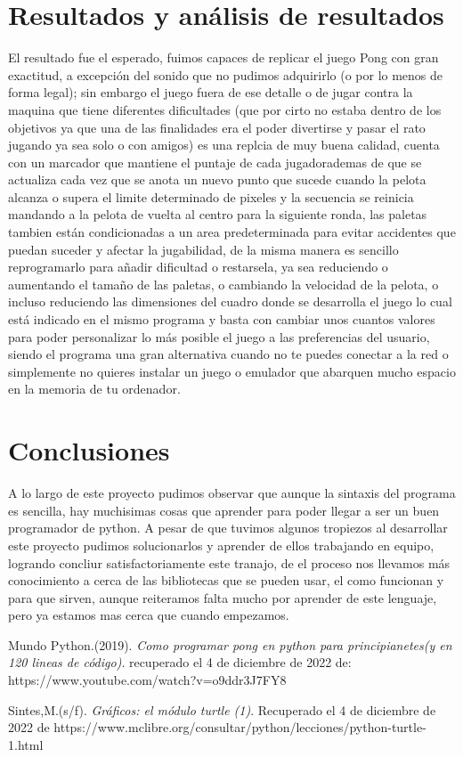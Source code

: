 \documentclass[journal]{IEEEtran}
\begin{document}
\section{Resultados y análisis de resultados}
El resultado fue el esperado, fuimos capaces de replicar el juego Pong con gran exactitud, a excepción del sonido que no pudimos adquirirlo (o por lo menos de forma legal); sin embargo el juego fuera de ese detalle o de jugar contra la maquina que tiene diferentes dificultades (que por cirto no estaba dentro de los objetivos ya que una de las finalidades era el poder divertirse y pasar el rato jugando ya sea solo o con amigos) es una replcia de muy buena calidad, cuenta con un marcador que mantiene el puntaje de cada jugadorademas de que se actualiza cada vez que se anota un nuevo punto que sucede cuando la pelota alcanza o supera el limite determinado de pixeles y la secuencia se reinicia mandando a la pelota de vuelta al centro para la siguiente ronda, las paletas tambien están condicionadas a un area predeterminada para evitar accidentes que puedan suceder y afectar la jugabilidad, de la misma manera es sencillo reprogramarlo para añadir dificultad o restarsela, ya sea reduciendo o aumentando el tamaño de las paletas, o cambiando la velocidad de la pelota, o incluso reduciendo las dimensiones del cuadro donde se desarrolla el juego lo cual está indicado en el mismo programa y basta con cambiar unos cuantos valores para poder personalizar lo más posible el juego a las preferencias del usuario, siendo el programa una gran alternativa cuando no te puedes conectar a la red o simplemente no quieres instalar un juego o emulador que abarquen mucho espacio en la memoria de tu ordenador. 

\section{Conclusiones}
A lo largo de este proyecto pudimos observar que aunque la sintaxis del programa es sencilla, hay muchisimas cosas que aprender para poder llegar a ser un buen programador de python.
A pesar de que tuvimos algunos tropiezos al desarrollar este proyecto pudimos  solucionarlos y aprender de ellos trabajando en equipo, logrando concliur satisfactoriamente este tranajo, de el proceso nos llevamos más conocimiento a cerca de las bibliotecas que se pueden usar, el como funcionan y para que sirven, aunque reiteramos falta mucho por aprender de este lenguaje, pero ya estamos mas cerca que cuando empezamos.


\begin{thebibliography}{1}

Mundo Python.(2019). \emph{Como programar pong en python para principianetes(y en 120 lineas de código)}. recuperado el 4 de diciembre de 2022 de: https://www.youtube.com/watch?v=o9ddr3J7FY8

Sintes,M.(s/f). \emph{Gráficos: el módulo turtle (1)}. Recuperado el 4 de diciembre de 2022 de https://www.mclibre.org/consultar/python/lecciones/python-turtle-1.html
  \end{thebibliography}
\end{document}
